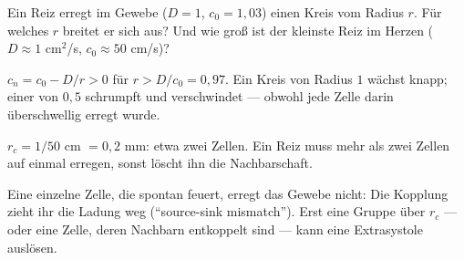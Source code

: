 \begin{aufgabe}
Ein Reiz erregt im Gewebe ($D = 1$, $c_{0} = 1{,}03$) einen Kreis vom Radius $r$. Für welches $r$ breitet er sich aus? Und wie groß ist der kleinste Reiz im Herzen ($D \approx 1$ cm$^{2}$/s, $c_{0} \approx 50$ cm/s)?

\loesung
{}
$c_{n} = c_{0} - D/r > 0$ für $r > D/c_{0} = 0{,}97$. Ein Kreis von Radius $1$ wächst knapp; einer von $0{,}5$ schrumpft und verschwindet --- obwohl jede Zelle darin überschwellig erregt wurde.

$r_{c} = 1/50$ cm $= 0{,}2$ mm: etwa zwei Zellen. Ein Reiz muss mehr als zwei Zellen auf einmal erregen, sonst löscht ihn die Nachbarschaft.

Eine einzelne Zelle, die spontan feuert, erregt das Gewebe nicht: Die Kopplung zieht ihr die Ladung weg (\enquote{source-sink mismatch}). Erst eine Gruppe über $r_{c}$ --- oder eine Zelle, deren Nachbarn entkoppelt sind --- kann eine Extrasystole auslösen.

\begin{center}
\begin{minipage}{0.88\textwidth}
\end{minipage}
\end{center}
\end{aufgabe}

